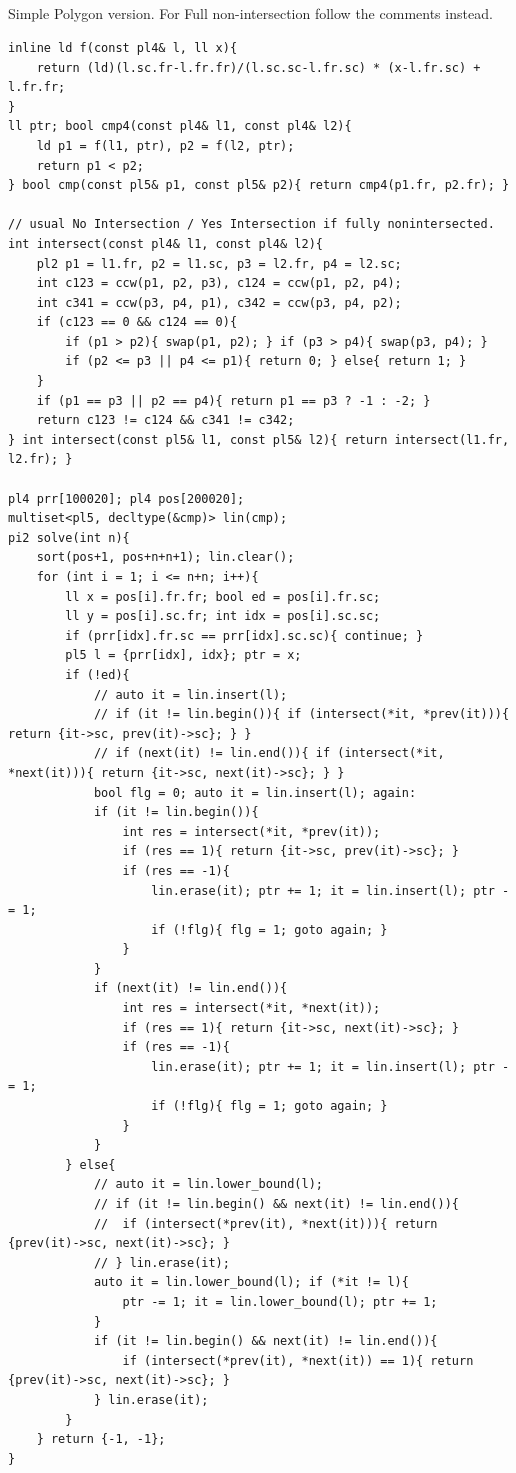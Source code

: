 \documentclass[landscape, 8pt, a4paper, oneside]{extarticle}
\begin{document}
\begin{multicols*}{3}
\subsection{}
Simple Polygon version. For Full non-intersection follow the comments instead.
\begin{verbatim}
inline ld f(const pl4& l, ll x){
	return (ld)(l.sc.fr-l.fr.fr)/(l.sc.sc-l.fr.sc) * (x-l.fr.sc) + l.fr.fr;
}
ll ptr; bool cmp4(const pl4& l1, const pl4& l2){
	ld p1 = f(l1, ptr), p2 = f(l2, ptr);
	return p1 < p2;
} bool cmp(const pl5& p1, const pl5& p2){ return cmp4(p1.fr, p2.fr); }

// usual No Intersection / Yes Intersection if fully nonintersected.
int intersect(const pl4& l1, const pl4& l2){
	pl2 p1 = l1.fr, p2 = l1.sc, p3 = l2.fr, p4 = l2.sc;
	int c123 = ccw(p1, p2, p3), c124 = ccw(p1, p2, p4);
	int c341 = ccw(p3, p4, p1), c342 = ccw(p3, p4, p2);
	if (c123 == 0 && c124 == 0){
		if (p1 > p2){ swap(p1, p2); } if (p3 > p4){ swap(p3, p4); }
		if (p2 <= p3 || p4 <= p1){ return 0; } else{ return 1; }
	}
	if (p1 == p3 || p2 == p4){ return p1 == p3 ? -1 : -2; }
	return c123 != c124 && c341 != c342;
} int intersect(const pl5& l1, const pl5& l2){ return intersect(l1.fr, l2.fr); }

pl4 prr[100020]; pl4 pos[200020];
multiset<pl5, decltype(&cmp)> lin(cmp);
pi2 solve(int n){
	sort(pos+1, pos+n+n+1); lin.clear();
	for (int i = 1; i <= n+n; i++){
		ll x = pos[i].fr.fr; bool ed = pos[i].fr.sc;
		ll y = pos[i].sc.fr; int idx = pos[i].sc.sc;
		if (prr[idx].fr.sc == prr[idx].sc.sc){ continue; }
		pl5 l = {prr[idx], idx}; ptr = x;
		if (!ed){
			// auto it = lin.insert(l);
			// if (it != lin.begin()){ if (intersect(*it, *prev(it))){ return {it->sc, prev(it)->sc}; } }
			// if (next(it) != lin.end()){ if (intersect(*it, *next(it))){ return {it->sc, next(it)->sc}; } }
			bool flg = 0; auto it = lin.insert(l); again:
			if (it != lin.begin()){
				int res = intersect(*it, *prev(it));
				if (res == 1){ return {it->sc, prev(it)->sc}; }
				if (res == -1){
					lin.erase(it); ptr += 1; it = lin.insert(l); ptr -= 1;
					if (!flg){ flg = 1; goto again; }
				}
			}
			if (next(it) != lin.end()){
				int res = intersect(*it, *next(it));
				if (res == 1){ return {it->sc, next(it)->sc}; }
				if (res == -1){
					lin.erase(it); ptr += 1; it = lin.insert(l); ptr -= 1;
					if (!flg){ flg = 1; goto again; }
				}
			}
		} else{
			// auto it = lin.lower_bound(l);
			// if (it != lin.begin() && next(it) != lin.end()){
			//	if (intersect(*prev(it), *next(it))){ return {prev(it)->sc, next(it)->sc}; }
			// } lin.erase(it);
			auto it = lin.lower_bound(l); if (*it != l){
				ptr -= 1; it = lin.lower_bound(l); ptr += 1;
			}
			if (it != lin.begin() && next(it) != lin.end()){
				if (intersect(*prev(it), *next(it)) == 1){ return {prev(it)->sc, next(it)->sc}; }
			} lin.erase(it);
		}
	} return {-1, -1};
}


\end{verbatim}
\end{multicols*}
\end{document}
